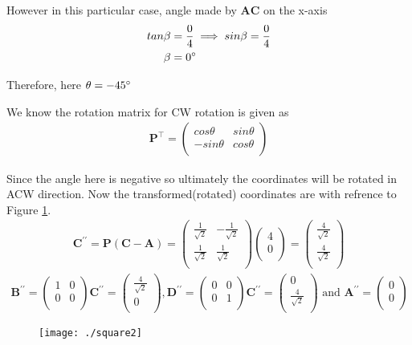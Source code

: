 \documentclass[12pt]{article}
\newcommand{\myvec}[1]{\ensuremath{\begin{pmatrix}#1\end{pmatrix}}}
\let\vec\mathbf
\begin{document}
However in this particular case, angle made by $\vec{AC}$ on the x-axis
\begin{align}
tan\beta &= \frac{0}{4} \implies sin\beta = \frac{0}{4}\\
\beta &= 0\degree
\end{align}

Therefore, here $\theta = -45\degree$

We know the rotation matrix for CW rotation is given as
\begin{align}
\vec{P}^\top =
\myvec{
cos\theta & sin\theta \\
-sin\theta & cos\theta \\
}
\end{align}

Since the angle here is negative so ultimately the coordinates will be rotated in ACW direction. Now the transformed(rotated) coordinates are with refrence to Figure \ref{fig:Fig3}.
\begin{align}
\vec{C^{\prime \prime}} = \vec{P}(\vec{C}-\vec{A}) =
\myvec{
\frac{1}{\sqrt{2}} & -\frac{1}{\sqrt{2}} \\
\frac{1}{\sqrt{2}} & \frac{1}{\sqrt{2}}\\
}
\myvec{
4 \\
0\\
} = 
\myvec{
\frac{4}{\sqrt{2}} \\
\frac{4}{\sqrt{2}}\\
}
\end{align}
\begin{align}
\vec{B^{\prime \prime}} = \myvec{
 1&0\\
 0&0\\
}\vec{C^{\prime \prime}}=
\myvec{
 \frac{4}{\sqrt{2}}\\
 0\\
},
\vec{D^{\prime \prime}} = \myvec{
 0&0\\
 0&1\\
}\vec{C^{\prime \prime}}=
\myvec{
 0\\
 \frac{4}{\sqrt{2}}\\
} \text{ and }
\vec{A^{\prime \prime}} =
\myvec{
0 \\
0\\
}
\end{align}

\begin{figure}[!h]
	\begin{center} 
	    \texttt{[image: ./square2]}
	\end{center}
\caption{}
\label{fig:Fig3}
\end{figure}
\end{document}
